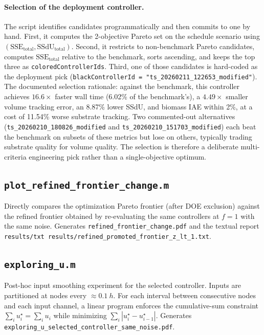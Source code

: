 \documentclass[11pt,a4paper]{article}
\newcommand{\sse}{\mathrm{SSE}}
\newcommand{\ssdu}{\mathrm{SSdU}}
\begin{document}
\paragraph{Selection of the deployment controller.}
The script identifies candidates programmatically and then commits to one by hand. First, it computes the 2-objective Pareto set on the schedule scenario using $(\sse_{\mathrm{total}}, \ssdu_{\mathrm{total}})$. Second, it restricts to non-benchmark Pareto candidates, computes $\sse_{\mathrm{total}}$ relative to the benchmark, sorts ascending, and keeps the top three as \texttt{coloredControllerIds}. Third, one of those candidates is hard-coded as the deployment pick (\texttt{blackControllerId = "ts\_20260211\_122653\_modified"}). The documented selection rationale: against the benchmark, this controller achieves $16.6\times$ faster wall time (6.02\% of the benchmark's), a $4.49\times$ smaller volume tracking error, an 8.87\% lower SSdU, and biomass IAE within 2\%, at a cost of 11.54\% worse substrate tracking. Two commented-out alternatives (\texttt{ts\_20260210\_180826\_modified} and \texttt{ts\_20260210\_151703\_modified}) each beat the benchmark on subsets of these metrics but lose on others, typically trading substrate quality for volume quality. The selection is therefore a deliberate multi-criteria engineering pick rather than a single-objective optimum.

\subsection{\texttt{plot\_refined\_frontier\_change.m}}
Directly compares the optimization Pareto frontier (after DOE exclusion) against the refined frontier obtained by re-evaluating the same controllers at $f = 1$ with the same noise. Generates \texttt{refined\_frontier\_change.pdf} and the textual report \texttt{results/txt results/refined\_promoted\_frontier\_z\_lt\_1.txt}.

\subsection{\texttt{exploring\_u.m}}
Post-hoc input smoothing experiment for the selected controller. Inputs are partitioned at nodes every $\approx \SI{0.1}{h}$. For each interval between consecutive nodes and each input channel, a linear program enforces the cumulative-sum constraint $\sum_i u^\star_i = \sum_i u_i$ while minimizing $\sum_i |u^\star_i - u^\star_{i-1}|$. Generates \texttt{exploring\_u\_selected\_controller\_same\_noise.pdf}.
\end{document}
